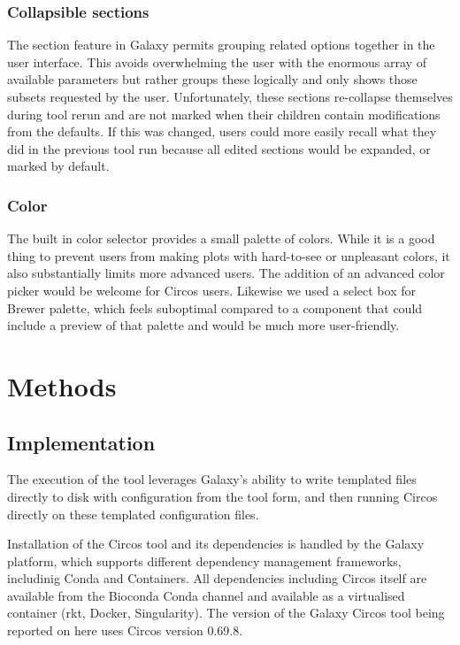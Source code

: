 \subsubsection*{Collapsible sections}

The section feature in Galaxy permits grouping related options together in the user interface. This avoids overwhelming the user with the enormous array of available parameters but rather groups these logically and only shows those subsets requested by the user. Unfortunately, these sections re-collapse themselves during tool rerun and are not marked when their children contain modifications from the defaults. If this was changed, users could more easily recall what they did in the previous tool run because all edited sections would be expanded, or marked by default.

\subsubsection*{Color}

The built in color selector provides a small palette of colors. While it is a good thing to prevent users from making plots with hard-to-see or unpleasant colors, it also substantially limits more advanced users. The addition of an advanced color picker would be welcome for Circos users. Likewise we used a select box for Brewer palette, which feels suboptimal compared to a component that could include a preview of that palette and would be much more user-friendly.


\section*{Methods}

\subsection*{Implementation}
The execution of the tool leverages Galaxy's ability to write templated files directly to disk with configuration from the tool form, and then running Circos directly on these templated configuration files.

Installation of the Circos tool and its dependencies is handled by the Galaxy platform, which supports different dependency management frameworks, includinig Conda and Containers. All dependencies including Circos itself are available from the Bioconda Conda channel \cite{gruning2018bioconda} and available as a virtualised container (rkt, Docker, Singularity). The version of the Galaxy Circos tool being reported on here uses Circos version 0.69.8.

